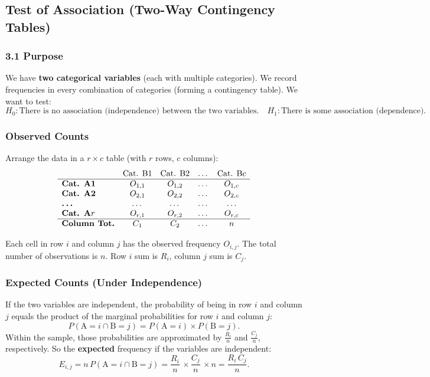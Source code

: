 \documentclass[10pt, total={6in, 8in}]{extarticle}
\begin{document}
\subsection{Test of Association (Two-Way Contingency Tables)}

\subsubsection{3.1 Purpose}
We have \textbf{two categorical variables} (each with multiple categories). We record frequencies in every combination of categories (forming a contingency table). We want to test:
$$
    H_0 : \text{There is no association (independence) between the two variables.}
    \quad
    H_1 : \text{There is some association (dependence).}
$$

\subsubsection{Observed Counts}

Arrange the data in a $r \times c$ table (with $r$ rows, $c$ columns):
\[
    \begin{array}{lcccc}
                             & \text{Cat. B1} & \text{Cat. B2} & \dots & \text{Cat. B}c \\
        \hline
        \textbf{Cat. A1}     & O_{1,1}        & O_{1,2}        & \dots & O_{1,c}        \\
        \textbf{Cat. A2}     & O_{2,1}        & O_{2,2}        & \dots & O_{2,c}        \\
        \textbf{\dots}       & \dots          & \dots          & \dots & \dots          \\
        \textbf{Cat. A}r     & O_{r,1}        & O_{r,2}        & \dots & O_{r,c}        \\
        \hline
        \textbf{Column Tot.} & C_1            & C_2            & \dots & n              \\
    \end{array}
\]

Each cell in row $i$ and column $j$ has the observed frequency $O_{i,j}$. The total number of observations is $n$. Row $i$ sum is $R_i$, column $j$ sum is $C_j$.

\subsubsection{Expected Counts (Under Independence)}

If the two variables are independent, the probability of being in row $i$ and column $j$ equals the product of the marginal probabilities for row $i$ and column $j$:
$$
    P(\text{A}=i \cap \text{B}=j)
    = P(\text{A}=i)\times P(\text{B}=j).
$$
Within the sample, those probabilities are approximated by $\frac{R_i}{n}$ and $\frac{C_j}{n}$, respectively. So the \textbf{expected} frequency if the variables are independent:
$$
    E_{i,j}
    = n\,P(\text{A}=i \cap \text{B}=j)
    = \frac{R_i}{n}\,\times \frac{C_j}{n}\,\times n
    = \frac{R_i \, C_j}{n}.
$$
\end{document}
